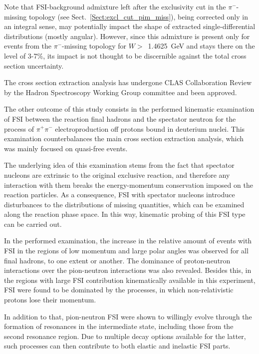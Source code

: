 Note that FSI-background admixture left after the exclusivity cut in the $\pi^{-}$-missing topology (see Sect.~\ref{Sect:excl_cut_pim_miss}), being corrected only in an integral sense, may potentially impact the shape of extracted single-differential distributions (mostly angular). However, since this admixture is present only for events from the $\pi^{-}$-missing topology for $W>$~1.4625~GeV and stays there on the level of 3-7\%, its impact is not thought to be discernible against the total cross section uncertainty.

The cross section extraction analysis has undergone CLAS Collaboration Review by the Hadron Spectroscopy Working Group committee and been approved. 



The other outcome of this study consists in the performed kinematic examination of FSI between the reaction final hadrons and the spectator neutron for the process of $\pi^{+}\pi^{-}$ electroproduction off protons bound in deuterium nuclei. This examination counterbalances the main cross section extraction analysis, which was mainly focused on quasi-free events. 



The underlying idea of this examination stems from the fact that spectator nucleons are extrinsic to the original exclusive reaction, and therefore any interaction with them breaks the energy-momentum conservation imposed on the reaction particles. As a consequence, FSI with spectator nucleons introduce disturbances to the distributions of missing quantities, which can be examined along the reaction phase space. In this way, kinematic probing of this FSI type can be carried out.



In the performed examination, the increase in the relative amount of events with FSI in the regions of low momentum and large polar angles was observed for all final hadrons, to one extent or another. The dominance of proton-neutron interactions over the pion-neutron interactions was  also revealed. Besides this, in the regions with large FSI contribution kinematically available in this experiment, FSI were found to be dominated by the processes, in which non-relativistic protons lose their momentum.

In addition to that, pion-neutron FSI were shown to willingly evolve through the formation of resonances in the intermediate state, including those from the second resonance region. Due to multiple decay options available for the latter, such processes can then contribute to both elastic and inelastic FSI parts.



